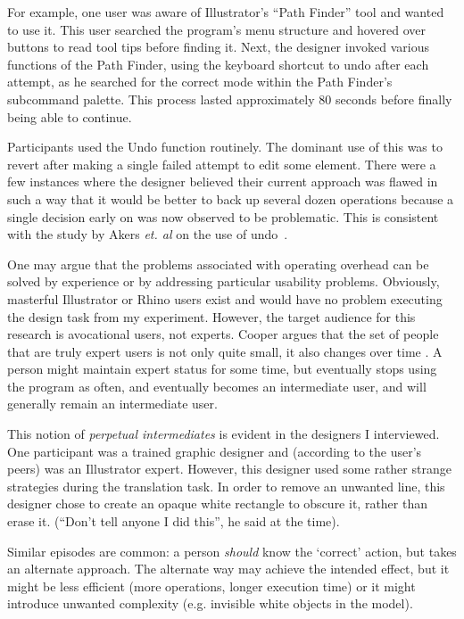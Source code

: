 \documentclass[11pt]{article}
\begin{document}
For example, one user was aware of Illustrator's ``Path Finder'' tool
and wanted to use it. This user searched the program's menu structure
and hovered over buttons to read tool tips before finding it. Next,
the designer invoked various functions of the Path Finder, using the
keyboard shortcut to undo after each attempt, as he searched for the
correct mode within the Path Finder's subcommand palette. This process
lasted approximately 80 seconds before finally being able to continue.

Participants used the Undo function routinely. The dominant use of
this was to revert after making a single failed attempt to edit some
element. There were a few instances where the designer believed their
current approach was flawed in such a way that it would be better to
back up several dozen operations because a single decision early on
was now observed to be problematic. This is consistent with the study
by Akers \textit{et. al} on the use of undo~\cite{akers-undo}.

One may argue that the problems associated with operating overhead can
be solved by experience or by addressing particular usability
problems. Obviously, masterful Illustrator or Rhino users exist and
would have no problem executing the design task from my
experiment. However, the target audience for this research is
avocational users, not experts. Cooper argues that the set of people
that are truly expert users is not only quite small, it also changes
over time \cite{cooper-inmates}. A person might maintain expert status
for some time, but eventually stops using the program as often, and
eventually becomes an intermediate user, and will generally remain an
intermediate user.

This notion of \textit{perpetual intermediates} is evident in the
designers I interviewed. One participant was a trained graphic
designer and (according to the user's peers) was an Illustrator
expert. However, this designer used some rather strange strategies
during the translation task. In order to remove an unwanted line, this
designer chose to create an opaque white rectangle to obscure it,
rather than erase it. (``Don't tell anyone I did this'', he said at
the time).

Similar episodes are common: a person \textit{should} know the
`correct' action, but takes an alternate approach. The alternate way
may achieve the intended effect, but it might be less efficient (more
operations, longer execution time) or it might introduce unwanted
complexity (e.g. invisible white objects in the model).
\end{document}
